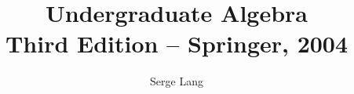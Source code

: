 \documentclass[english, 11pt, a4paper]{book}
\begin{document}
\DeclareRobustCommand{\rchi}{{\mathpalette\irchi\relax}}
\newcommand{\irchi}[2]{\raisebox{\depth}{$#1\chi$}} %

\makeatletter
\newcommand{\mybox}{%
    \collectbox{%
        \setlength{\fboxsep}{1pt}%
        \fbox{\BOXCONTENT}%
    }%
}
\makeatother

\author{Serge Lang}
\title{Undergraduate Algebra\\
\small{Third Edition -- Springer, 2004}}
\maketitle

\frontmatter%

%

%	
\setcounter{tocdepth}{1}	%
\tableofcontents

\mainmatter%






\backmatter%
%
\printindex

\end{document}
